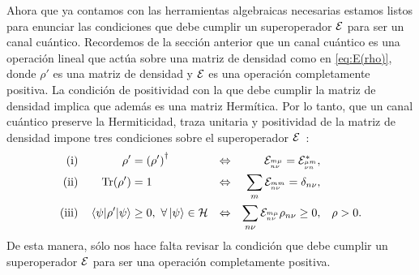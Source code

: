 Ahora que ya contamos con las herramientas algebraicas necesarias
estamos listos para enunciar las condiciones que debe cumplir un 
superoperador $\mathcal{E}$ para ser un canal cuántico. 
Recordemos de la sección anterior que un canal cuántico 
es una operación lineal que actúa sobre una matriz de densidad 
como en \eqref{eq:E(rho)}, donde $\rho'$
es una matriz de densidad y $\mathcal{E}$ es una operación completamente positiva.
La condición de positividad con la que debe cumplir la matriz de densidad 
implica que además es una matriz Hermítica. 
Por lo tanto, que un canal cuántico preserve la Hermiticidad, traza unitaria 
y positividad de la matriz de densidad impone tres condiciones 
sobre el superoperador $\mathcal{E}$~\cite{bengtsson_zyczkowski_2017}:
\begin{align}
\txt{(i)}&& \rho'&=\qty(\rho')^{\dagger}&\Leftrightarrow
    && \E_\ind{m\mu}{n\nu}=\E_\ind{\mu m}{\nu n}^*,&&
    \label{eq:H-condition}\\
\txt{(ii)}&&\Tr(\rho')&=1
    &\Leftrightarrow&&  \sum_{m}\E_\ind{mm}{n\nu}=\delta_{n\nu},&
    \label{eq:Tr-condition}\\     
\txt{(iii)}&&\matrixel{\psi}{\rho'}{\psi}&\geq0,\ \forall \ket{\psi} \in \hi
    &\Leftrightarrow&&  \sum_{n\nu}\E_{\ind{m\mu}{n\nu}}\rho_{n\nu}\geq0,& 
    & \rho>0.
    \label{eq:positivity-condition}
\end{align}
De esta manera, sólo nos hace falta revisar la condición que debe cumplir
un superoperador $\mathcal{E}$ para ser una operación completamente positiva.
 
